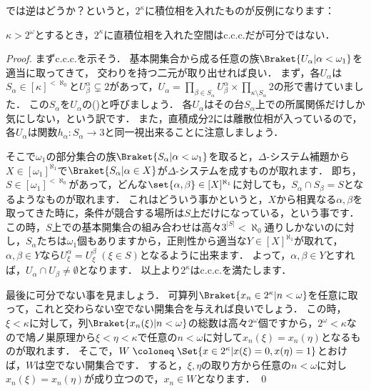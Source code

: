 \documentclass[a4j]{ltjsarticle}
\renewcommand{\defeq}{\mathrel{\coloneq}}
\renewcommand{\emph}[1]{\textsf{\textgt{#1}}}
\begin{document}
では逆はどうか？というと，$2^\kappa$に積位相を入れたものが反例になります：
\begin{lemma}
 $\kappa > 2^\omega$とするとき，$2^\kappa$に直積位相を入れた空間はc.c.c.だが可分ではない．
\end{lemma}
\begin{proof}
 まずc.c.c.を示そう．
 基本開集合から成る任意の族$\Braket{U_\alpha | \alpha < \omega_1}$を適当に取ってきて，
 交わりを持つ二元が取り出せれば良い．
 まず，各$U_\alpha$は$S_\alpha \in [\kappa]^{<\aleph_0}$と$U^\alpha_\beta \subsetneq 2$があって，$U_\alpha = \prod_{\beta \in S_\alpha} U^\alpha_\beta \times \prod_{\kappa \setminus S_\alpha} 2$の形で書けていました．
 この$S_\alpha$を$U_\alpha$の\emph{台}(\emph{support})と呼びましょう．
 各$U_\alpha$はその台$S_\alpha$上での所属関係だけしか気にしない，という訳です．
 また，直積成分$2$には離散位相が入っているので，各$U_\alpha$は関数$h_\alpha : S_\alpha \to 3$と同一視出来ることに注意しましょう．

 そこで$\omega_1$の部分集合の族$\Braket{S_\alpha | \alpha < \omega_1}$を取ると，$\Delta$-システム補題から$X \in [\omega_1]^{\aleph_1}$で$\Braket{S_\alpha | \alpha \in X}$が$\Delta$-システムを成すものが取れます．
 即ち，$S \in [\omega_1]^{<\aleph_0}$があって，どんな$\set{\alpha, \beta} \in [X]^{\aleph_1}$に対しても，$S_\alpha \cap S_\beta = S$となるようなものが取れます．
 これはどういう事かというと，$X$から相異なる$\alpha, \beta$を取ってきた時に，条件が競合する場所は$S$上だけになっている，という事です．
 この時，$S$上での基本開集合の組み合わせは高々$3^{|S|} < \aleph_0$通りしかないのに対し，$S_\alpha$たちは$\omega_1$個もありますから，正則性から適当な$Y \in [X]^{\aleph_1}$が取れて，$\alpha, \beta \in Y$なら$U^\alpha_\xi = U^\beta_\xi \;(\xi \in S)$となるように出来ます．
 よって，$\alpha, \beta \in Y$とすれば，$U_\alpha \cap U_\beta \neq \emptyset$となります．
 以上より$2^\kappa$はc.c.c.を満たします．

 最後に可分でない事を見ましょう．
 可算列$\Braket{x_n \in 2^\kappa | n < \omega}$を任意に取って，これと交わらない空でない開集合を与えれば良いでしょう．
 この時，$\xi < \kappa$に対して，列$\Braket{x_n(\xi) | n < \omega}$の総数は高々$2^\omega$個ですから，$2^\omega < \kappa$なので鳩ノ巣原理から$\xi < \eta < \kappa$で任意の$n < \omega$に対して$x_n(\xi) = x_n(\eta)$となるものが取れます．
 そこで，$W \defeq \Set{x \in 2^\kappa | x(\xi) = 0, x(\eta) = 1}$とおけば，$W$は空でない開集合です．
 すると，$\xi, \eta$の取り方から任意の$n < \omega$に対し$x_n(\xi) = x_n(\eta)$が成り立つので，$x_n \in W$となります． \qed
\end{proof}
\end{document}
